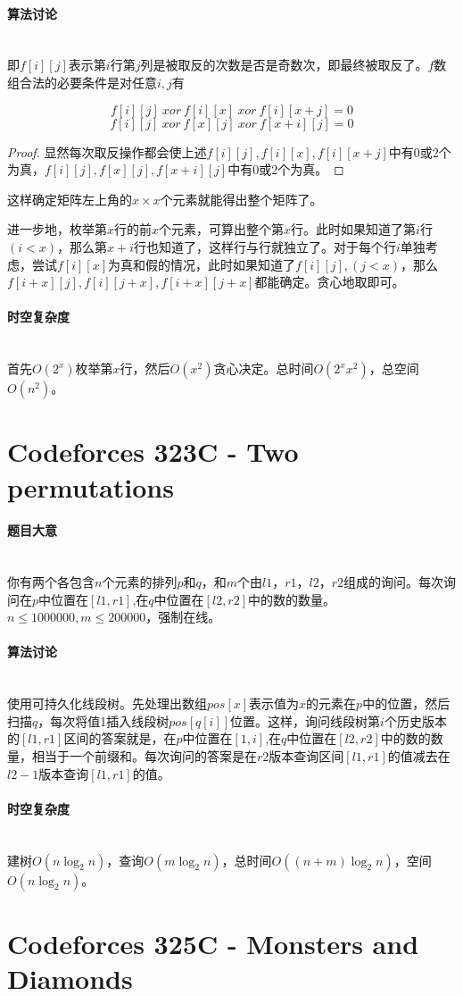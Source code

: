 \documentclass[UTF8]{ctexart}
\newcommand{\myparagraph}[1]{\paragraph{#1}\mbox{}\\}
\theoremstyle{nonumberplain}
\newtheorem{proof}{\hspace{1em}证明：}
\begin{document}
		\myparagraph{算法讨论}
		
			即$f[i][j]$表示第$i$行第$j$列是被取反的次数是否是奇数次，即最终被取反了。$f$数组合法的必要条件是对任意$i,j$有
			
			$$f[i][j]\ xor\ f[i][x]\ xor\ f[i][x+j]=0$$
			$$f[i][j]\ xor\ f[x][j]\ xor\ f[x+i][j]=0$$
			
			\begin{proof}显然每次取反操作都会使上述$f[i][j],f[i][x],f[i][x+j]$中有0或2个为真，$f[i][j],f[x][j],f[x+i][j]$中有0或2个为真。\end{proof}
			
			这样确定矩阵左上角的$x \times x$个元素就能得出整个矩阵了。
			
			进一步地，枚举第$x$行的前$x$个元素，可算出整个第$x$行。此时如果知道了第$i$行$(i<x)$，那么第$x+i$行也知道了，这样行与行就独立了。对于每个行$i$单独考虑，尝试$f[i][x]$为真和假的情况，此时如果知道了$f[i][j],(j<x)$，那么$f[i+x][j],f[i][j+x],f[i+x][j+x]$都能确定。贪心地取即可。
	
		\myparagraph{时空复杂度}
		
			首先$O(2^x)$枚举第$x$行，然后$O(x^2)$贪心决定。总时间$O(2^xx^2)$，总空间$O(n^2)$。
		
	\section{Codeforces 323C - Two permutations}
	
		\myparagraph{题目大意}
		
			你有两个各包含$n$个元素的排列$p$和$q$，和$m$个由$l1$，$r1$，$l2$，$r2$组成的询问。每次询问在$p$中位置在$[l1,r1]$,在$q$中位置在$[l2,r2]$中的数的数量。$n \leq 1000000, m \leq 200000$，强制在线。
			
		\myparagraph{算法讨论}
		
			使用可持久化线段树。先处理出数组$pos[x]$表示值为$x$的元素在$p$中的位置，然后扫描$q$，每次将值1插入线段树$pos[q[i]]$位置。这样，询问线段树第$i$个历史版本的$[l1,r1]$区间的答案就是，在$p$中位置在$[1,i]$,在$q$中位置在$[l2,r2]$中的数的数量，相当于一个前缀和。每次询问的答案是在$r2$版本查询区间$[l1,r1]$的值减去在$l2-1$版本查询$[l1,r1]$的值。
	
		\myparagraph{时空复杂度}
		
			建树$O(n\log_2n)$，查询$O(m\log_2n)$，总时间$O((n+m)\log_2n)$，空间$O(n\log_2n)$。
	
	\section{Codeforces 325C - Monsters and Diamonds}
	
\end{document}
